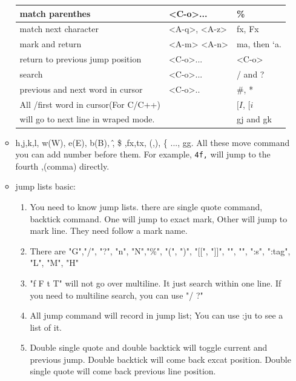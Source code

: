 \documentclass[a4paper,12pt,twoside]{book}
\begin{document}
\begin{itemize}
\begin{itemize}
\begin{center}
\begin{tabular}{p{}|p{}|p{}}
         \hline 		
         match parenthes & <C-o>... & \%   \\
         
         \hline match next character &<A-q>, <A-z>& fx, Fx \\
         
        \hline mark and return & <A-m> <A-n> & ma, then `a. \\
        
        \hline return to previous jump position & <C-o>... & <C-o> \\    
      				
		\hline
        search &<C-o>...  & / and ? \\

       \hline       
		previous and next word in cursor & <C-o>.. & \#, * \\

		\hline 
		All /first word in cursor(For C/C++) &  & $[I$, $[i$  \\ 

		\hline 
		will go to next line in wraped mode. & &  gj and gk \\
		\hline 

\end{tabular}
\end{center}
		\item h,j,k,l, w(W), e(E), b(B), \^ , \$ ,fx,tx, (,), \{ ..., gg. All these move command you can add number before them. For example, \verb=4f,= will jump to the fourth ,(comma) directly.    

\item jump lists basic:
		
\begin{enumerate}
		\item You need to know jump lists. there are single quote command, backtick command. One will jump to exact mark, Other will jump to mark line. They need follow a mark name.

		\item There are "G","/", "?", "n", "N","\%", "(", ")", "[[", "]]", "{", "}", ":s", ":tag", "L", "M", "H"

		\item "f F t T" will not go over multiline. It just search within one line. If you need to multiline search, you can use "/ ?"

		\item All jump command will record in jump list; You can use :ju to see a list of it.

		\item Double single quote and double backtick will toggle current and previous jump. Double backtick will come back excat position. Double single quote will come back previous line position.


\end{enumerate}
\end{itemize}
\end{itemize}
\end{document}
